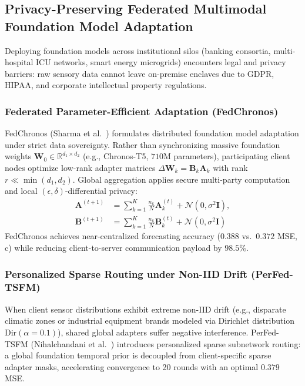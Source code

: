 \subsection{Privacy-Preserving Federated Multimodal Foundation Model Adaptation}
\label{sec:federated_foundation}
Deploying foundation models across institutional silos (banking consortia, multi-hospital ICU networks, smart energy microgrids) encounters legal and privacy barriers: raw sensory data cannot leave on-premise enclaves due to GDPR, HIPAA, and corporate intellectual property regulations.

\subsubsection{Federated Parameter-Efficient Adaptation (FedChronos)}
FedChronos (Sharma et al.~\cite{Sharma2026FedChronos}) formulates distributed foundation model adaptation under strict data sovereignty. Rather than synchronizing massive foundation weights $\mathbf{W}_0 \in \mathbb{R}^{d_1 \times d_2}$ (e.g., Chronos-T5, $710$M parameters), participating client nodes optimize low-rank adapter matrices $\Delta \mathbf{W}_k = \mathbf{B}_k \mathbf{A}_k$ with rank $r \ll \min(d_1, d_2)$. Global aggregation applies secure multi-party computation and local $(\epsilon, \delta)$-differential privacy:
\begin{equation}
\begin{aligned}
    \mathbf{A}^{(t+1)} &= \sum_{k=1}^K \frac{n_k}{N} \mathbf{A}_k^{(t)} + \mathcal{N}\left(0, \sigma^2 \mathbf{I}\right), \\
    \mathbf{B}^{(t+1)} &= \sum_{k=1}^K \frac{n_k}{N} \mathbf{B}_k^{(t)} + \mathcal{N}\left(0, \sigma^2 \mathbf{I}\right)
\end{aligned}
\end{equation}
FedChronos achieves near-centralized forecasting accuracy ($0.388$ vs.\ $0.372$ MSE, c) while reducing client-to-server communication payload by $98.5\%$.

\subsubsection{Personalized Sparse Routing under Non-IID Drift (PerFed-TSFM)}
When client sensor distributions exhibit extreme non-IID drift (e.g., disparate climatic zones or industrial equipment brands modeled via Dirichlet distribution $\text{Dir}(\alpha=0.1)$), shared global adapters suffer negative interference. PerFed-TSFM (Nihalchandani et al.~\cite{Nihalchandani2026PerFedTSFM}) introduces personalized sparse subnetwork routing: a global foundation temporal prior is decoupled from client-specific sparse adapter masks, accelerating convergence to 20 rounds with an optimal $0.379$ MSE.

